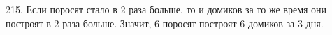 215. Если поросят стало в 2 раза больше, то и домиков за то же время они построят в 2 раза больше. Значит, 6 поросят построят 6 домиков за 3 дня.\\
